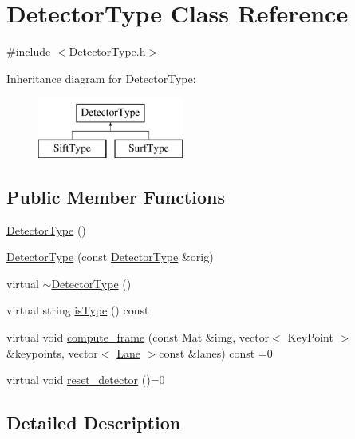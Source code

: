 \hypertarget{class_detector_type}{
\section{\-Detector\-Type \-Class \-Reference}
\label{class_detector_type}
}


{\ttfamily \#include $<$\-Detector\-Type.\-h$>$}

\-Inheritance diagram for \-Detector\-Type\-:\begin{figure}[H]
\begin{center}
\leavevmode
\includegraphics[height=2.000000cm]{class_detector_type}
\end{center}
\end{figure}
\subsection*{\-Public \-Member \-Functions}
\begin{DoxyCompactItemize}
\item 
\hyperlink{class_detector_type_ad3e2ed33c53955544f26ca824de8db98}{\-Detector\-Type} ()
\item 
\hyperlink{class_detector_type_ab8366f3bbc11aa3e9cd70c97cd2a27ac}{\-Detector\-Type} (const \hyperlink{class_detector_type}{\-Detector\-Type} \&orig)
\item 
virtual \hyperlink{class_detector_type_a66361aaca00c82124170556b3c487279}{$\sim$\-Detector\-Type} ()
\item 
virtual string \hyperlink{class_detector_type_a2a8cfc2d84b8dbade17548be48d1498f}{is\-Type} () const 
\item 
virtual void \hyperlink{class_detector_type_ad147fbbe562819244a3c92cf4dc5d999}{compute\-\_\-frame} (const \-Mat \&img, vector$<$ \-Key\-Point $>$ \&keypoints, vector$<$ \hyperlink{class_lane}{\-Lane} $>$const \&lanes) const =0
\item 
virtual void \hyperlink{class_detector_type_a1115eaed51cec6ea0d4183edba767da0}{reset\-\_\-detector} ()=0
\end{DoxyCompactItemize}


\subsection{\-Detailed \-Description}


